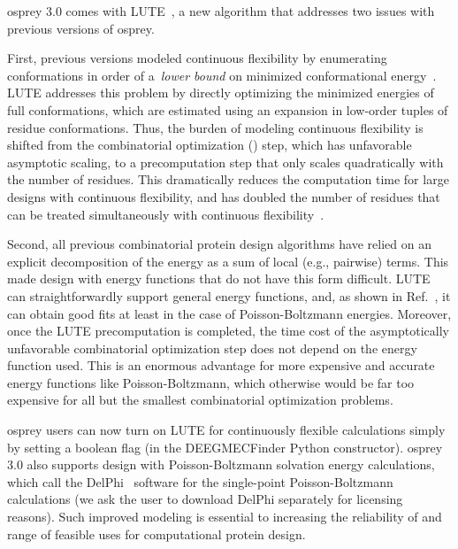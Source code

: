 {\sc osprey} 3.0 comes with LUTE~\cite{LUTE_RECOMB}, a new algorithm that addresses two issues with previous versions of {\sc osprey}.  

First, previous versions modeled continuous flexibility by enumerating conformations in order of a~\textit{lower bound} on minimized conformational energy~\cite{minDEE,iMinDEE}. LUTE addresses this problem by directly optimizing the minimized energies of full conformations, which are estimated using an expansion in low-order tuples of residue conformations.  Thus, the burden of modeling continuous flexibility is shifted from the combinatorial optimization (\as) step, which has unfavorable asymptotic scaling, to a precomputation step that only scales quadratically with the number of residues. This dramatically reduces the computation time for large designs with continuous flexibility, and has doubled the number of residues that can be treated simultaneously with continuous flexibility~\cite{LUTE_RECOMB}.    

Second, all previous combinatorial protein design algorithms have relied on an explicit decomposition of the energy as a sum of local (e.g., pairwise) terms.  This made design with energy functions that do not have this form difficult. LUTE can straightforwardly support general energy functions, and, as shown in Ref.~, it can obtain good fits at least in the case of Poisson-Boltzmann energies.  Moreover, once the LUTE precomputation is completed, the time cost of the asymptotically unfavorable combinatorial optimization step does not depend on the energy function used.  This is an enormous advantage for more expensive and accurate energy functions like Poisson-Boltzmann, which otherwise would be far too expensive for all but the smallest combinatorial optimization problems.  

{\sc osprey} users can now turn on LUTE for continuously flexible calculations simply by setting a boolean flag (in the DEEGMECFinder Python constructor). 
{\sc osprey} 3.0 also supports design with Poisson-Boltzmann solvation energy calculations, which call the DelPhi~\cite{OSOR,DelPhi_surface} software for the single-point Poisson-Boltzmann calculations (we ask the user to download DelPhi separately for licensing reasons). Such improved modeling is essential to increasing the reliability of and range of feasible uses for computational protein design.  